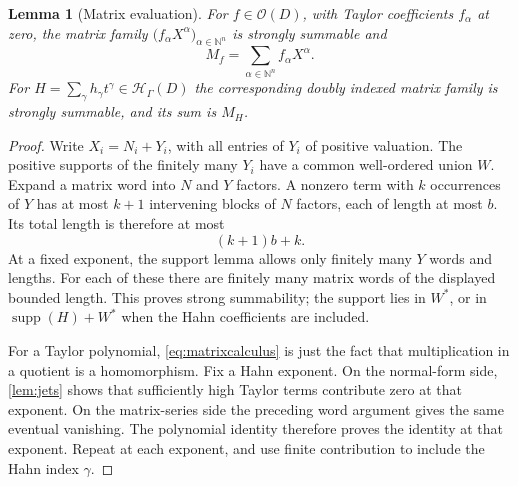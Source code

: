 \documentclass[11pt,letterpaper]{article}
\newtheorem{lemma}[theorem]{Lemma}
\theoremstyle{definition}
\theoremstyle{remark}
\newcommand{\N}{\mathbb N}
\newcommand{\OO}{\mathcal O}
\newcommand{\HH}{\mathcal H}
\newcommand{\supp}{\operatorname{supp}}
\numberwithin{equation}{section}
\begin{document}
\begin{lemma}[Matrix evaluation]\label{lem:matrix}
For $f\in\OO(D)$, with Taylor coefficients $f_\alpha$ at zero, the matrix family $\bigl(f_\alpha X^\alpha\bigr)_{\alpha\in\N^n}$ is strongly summable and
\begin{equation}\label{eq:matrixcalculus}
 M_f=\sum_{\alpha\in\N^n}f_\alpha X^\alpha.
\end{equation}
For $H=\sum_\gamma h_\gamma t^\gamma\in\HH_\Gamma(D)$ the corresponding doubly indexed matrix family is strongly summable, and its sum is $M_H$.
\end{lemma}
\begin{proof}
Write $X_i=N_i+Y_i$, with all entries of $Y_i$ of positive valuation. The positive supports of the finitely many $Y_i$ have a common well-ordered union $W$. Expand a matrix word into $N$ and $Y$ factors. A nonzero term with $k$ occurrences of $Y$ has at most $k+1$ intervening blocks of $N$ factors, each of length at most $b$. Its total length is therefore at most
\[
 (k+1)b+k.
\]
At a fixed exponent, the support lemma allows only finitely many $Y$ words and lengths. For each of these there are finitely many matrix words of the displayed bounded length. This proves strong summability; the support lies in $W^*$, or in $\supp(H)+W^*$ when the Hahn coefficients are included.

For a Taylor polynomial, \eqref{eq:matrixcalculus} is just the fact that multiplication in a quotient is a homomorphism. Fix a Hahn exponent. On the normal-form side, \cref{lem:jets} shows that sufficiently high Taylor terms contribute zero at that exponent. On the matrix-series side the preceding word argument gives the same eventual vanishing. The polynomial identity therefore proves the identity at that exponent. Repeat at each exponent, and use finite contribution to include the Hahn index $\gamma$.
\end{proof}
\end{document}
